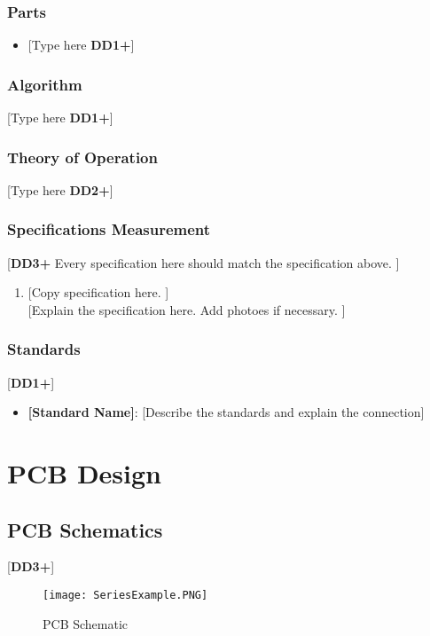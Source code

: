 \documentclass[letterpaper, 11pt]{article}
\begin{document}
\subsubsection{Parts}
\begin{itemize}
    \item {[Type here \textbf{DD1+}]}
\end{itemize}

\subsubsection{Algorithm}
[Type here \textbf{DD1+}]

\subsubsection{Theory of Operation}
[Type here \textbf{DD2+}]

\subsubsection{Specifications Measurement}
[\textbf{DD3+} Every specification here should match the specification above. ]
\begin{enumerate}
    \item {[Copy specification here. ]} \\
    {[Explain the specification here. Add photoes if necessary. ]}
\end{enumerate}

\subsubsection{Standards}
[\textbf{DD1+}]
\begin{itemize}
    \item \textbf{[Standard Name]}: [Describe the standards and explain the connection]
\end{itemize}

\clearpage
\section{PCB Design}
\subsection{PCB Schematics}
[\textbf{DD3+}]
\begin{figure}[!h]
    \centering
    \texttt{[image: SeriesExample.PNG]} %
    \caption{PCB Schematic}
\end{figure}
\end{document}
